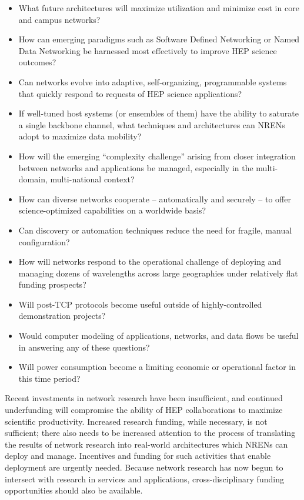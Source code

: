 \begin{itemize}
\item What future architectures will maximize utilization and minimize cost in core and campus networks?
\item How can emerging paradigms such as Software Defined Networking or Named Data Networking be harnessed most effectively to improve HEP science outcomes?
\item Can networks evolve into adaptive, self-organizing, programmable systems that quickly respond to requests of HEP science applications? 
\item If well-tuned host systems (or ensembles of them) have the ability to saturate a single backbone channel, what techniques and architectures can NRENs adopt to maximize data mobility?
\item How will the emerging “complexity challenge” arising from closer integration between networks and applications be managed, especially in the multi-domain, multi-national context?
\item How can diverse networks cooperate – automatically and securely – to offer science-optimized capabilities on a worldwide basis? 
\item Can discovery or automation techniques reduce the need for fragile, manual configuration? 
\item How will networks respond to the operational challenge of deploying  and managing dozens of wavelengths across large geographies under relatively flat funding prospects? 
\item Will post-TCP protocols become useful outside of highly-controlled demonstration projects? 
\item Would computer modeling of applications, networks, and data flows be useful in answering any of these questions?  
\item Will power consumption become a limiting economic or operational factor in this time period? 
\end{itemize}

Recent investments in network research have been insufficient, and continued underfunding will compromise the ability of HEP collaborations to maximize scientific productivity. Increased research funding, while necessary, is not sufficient; there also needs to be increased attention to the process of translating the results of network research into real-world architectures which NRENs can deploy and manage. Incentives and funding for such activities that enable deployment
are urgently needed. Because network research has now begun to intersect with research in services and applications, cross-disciplinary funding opportunities should also be available.  

